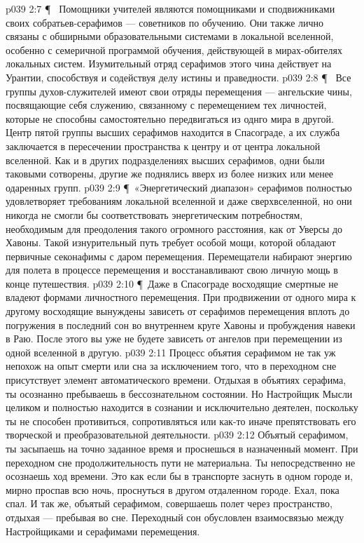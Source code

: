 \vs p039 2:7 \P\ \bibnobreakspace {} Помощники учителей являются помощниками и сподвижниками своих собратьев\hyp{}серафимов --- советников по обучению. Они также лично связаны с обширными образовательными системами в локальной вселенной, особенно с семеричной программой обучения, действующей в мирах\hyp{}обителях локальных систем. Изумительный отряд серафимов этого чина действует на Урантии, способствуя и содействуя делу истины и праведности.
\vs p039 2:8 \P\ \bibnobreakspace {} Все группы духов\hyp{}служителей имеют свои отряды перемещения --- ангельские чины, посвящающие себя служению, связанному с перемещением тех личностей, которые не способны самостоятельно передвигаться из однго мира в другой. Центр пятой группы высших серафимов находится в Спасограде, а их служба заключается в пересечении пространства к центру и от центра локальной вселенной. Как и в других подразделениях высших серафимов, одни были таковыми сотворены, другие же поднялись вверх из более низких или менее одаренных групп.
\vs p039 2:9 \P\ «Энергетический диапазон» серафимов полностью удовлетворяет требованиям локальной вселенной и даже сверхвселенной, но они никогда не смогли бы соответствовать энергетическим потребностям, необходимым для преодоления такого огромного расстояния, как от Уверсы до Хавоны. Такой изнурительный путь требует особой мощи, которой обладают первичные секонафимы с даром перемещения. Перемещатели набирают энергию для полета в процессе перемещения и восстанавливают свою личную мощь в конце путешествия.
\vs p039 2:10 \P\ Даже в Спасограде восходящие смертные не владеют формами личностного перемещения. При продвижении от одного мира к другому восходящие вынуждены зависеть от серафимов перемещения вплоть до погружения в последний сон во внутреннем круге Хавоны и пробуждения навеки в Раю. После этого вы уже не будете зависеть от ангелов при перемещении из одной вселенной в другую.
\vs p039 2:11 Процесс объятия серафимом не так уж непохож на опыт смерти или сна за исключением того, что в переходном сне присутствует элемент автоматического времени. Отдыхая в объятиях серафима, ты осознанно пребываешь в бессознательном состоянии. Но Настройщик Мысли целиком и полностью находится в сознании и исключительно деятелен, поскольку ты не способен противиться, сопротивляться или как\hyp{}то иначе препятствовать его творческой и преобразовательной деятельности.
\vs p039 2:12 Объятый серафимом, ты засыпаешь на точно заданное время и проснешься в назначенный момент. При переходном сне продолжительность пути не материальна. Ты непосредственно не осознаешь ход времени. Это как если бы в транспорте заснуть в одном городе и, мирно проспав всю ночь, проснуться в другом отдаленном городе. Ехал, пока спал. И так же, объятый серафимом, совершаешь полет через пространство, отдыхая --- пребывая во сне. Переходный сон обусловлен взаимосвязью между Настройщиками и серафимами перемещения.
